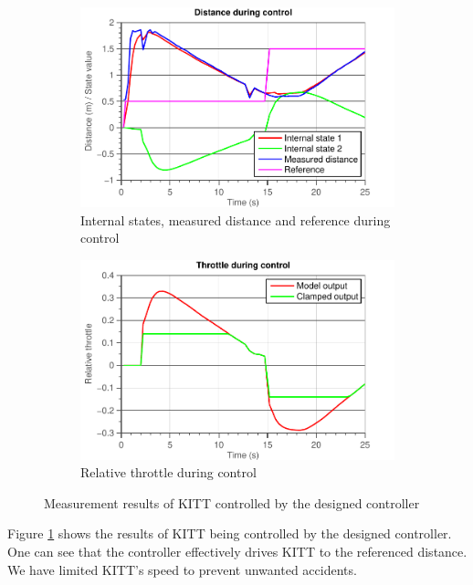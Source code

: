 \documentclass[11pt,titlepage]{report}
\begin{document}
\begin{figure}[H]
	\begin{subfigure}{.5\textwidth}
		\centering
		\includegraphics[width=\linewidth]{resource/measurement-states.pdf}
		\caption{Internal states, measured distance and reference during control}
	\end{subfigure}
	\begin{subfigure}{.5\textwidth}
		\centering
		\includegraphics[width=\linewidth]{resource/measurement-drive.pdf}
		\caption{Relative throttle during control}
	\end{subfigure}
	\caption{Measurement results of KITT controlled by the designed controller}
	\label{fig:ass-2-kitt-controlled}
\end{figure}

Figure \ref{fig:ass-2-kitt-controlled} shows the results of KITT being controlled by the designed controller. One can see that the controller effectively drives KITT to the referenced distance. We have limited KITT's speed to prevent unwanted accidents.
\end{document}
